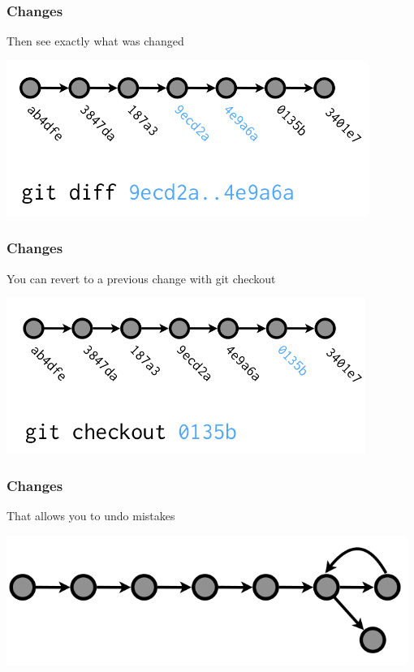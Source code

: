   \begin{frame}[t]
    \frametitle{Changes}
    Then see exactly what was changed 
    \begin{center}
      \includegraphics[height=2.00in]{../images/from-wickham-04.png} 
    \end{center} 
  \end{frame}

  \begin{frame}[t]
    \frametitle{Changes}
    You can revert to a previous change with git checkout
    \begin{center}
      \includegraphics[height=2.00in]{../images/from-wickham-05.png} 
    \end{center} 
  \end{frame}

  \begin{frame}[t]
    \frametitle{Changes}
    That allows you to undo mistakes
    \begin{center}
      \includegraphics[width=0.98\textwidth]{../images/from-wickham-06.png} 
    \end{center} 
  \end{frame}
